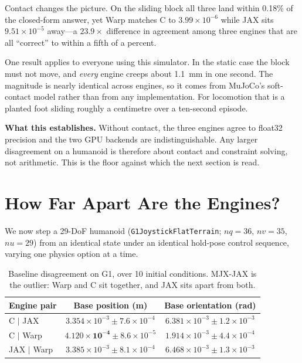 \documentclass[conference]{IEEEtran}
\newcommand{\tabfont}{\footnotesize}
\begin{document}
Contact changes the picture. On the sliding block all three land within
0.18\% of the closed-form answer, yet Warp matches C to
$3.99\times10^{-6}$ while JAX sits $9.51\times10^{-5}$ away---a
$23.9\times$ difference in agreement among three engines that are all
``correct'' to within a fifth of a percent.

One result applies to everyone using this simulator. In the static case
the block must not move, and \emph{every} engine creeps about 1.1~mm in
one second. The magnitude is nearly identical across engines, so it comes
from MuJoCo's soft-contact model rather than from any implementation. For
locomotion that is a planted foot sliding roughly a centimetre over a
ten-second episode.

\textbf{What this establishes.} Without contact, the three engines agree
to float32 precision and the two GPU backends are indistinguishable. Any
larger disagreement on a humanoid is therefore about contact and
constraint solving, not arithmetic. This is the floor against which the
next section is read.

\section{How Far Apart Are the Engines?}
\label{sec:howfar}

We now step a 29-DoF humanoid (\texttt{G1JoystickFlatTerrain};
$nq=36$, $nv=35$, $nu=29$) from an identical state under an identical
hold-pose control sequence, varying one physics option at a time.

\begin{table}[t]
\caption{Baseline disagreement on G1, over 10 initial conditions.
MJX-JAX is the outlier: Warp and C sit together, and JAX sits apart from
both.}
\label{tab:baseline}
\centering
\tabfont
\begin{tabular}{@{}lcc@{}}
\toprule
\textbf{Engine pair} & \textbf{Base position (m)} & \textbf{Base orientation (rad)} \\
\midrule
C $|$ JAX   & $3.354\!\times\!10^{-3} \pm 7.6\!\times\!10^{-4}$ & $6.381\!\times\!10^{-3} \pm 1.2\!\times\!10^{-3}$ \\
C $|$ Warp  & $\mathbf{4.120\!\times\!10^{-4}} \pm 8.6\!\times\!10^{-5}$ & $1.914\!\times\!10^{-3} \pm 4.4\!\times\!10^{-4}$ \\
JAX $|$ Warp & $3.385\!\times\!10^{-3} \pm 8.1\!\times\!10^{-4}$ & $6.468\!\times\!10^{-3} \pm 1.3\!\times\!10^{-3}$ \\
\bottomrule
\end{tabular}
\end{table}
\end{document}
